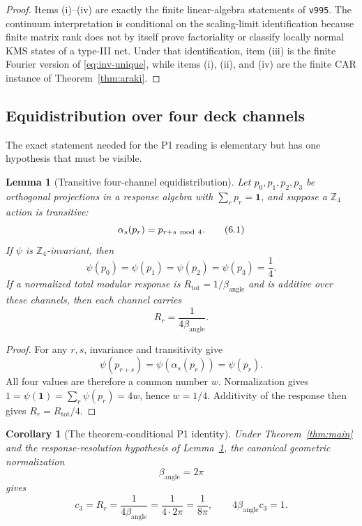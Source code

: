 \documentclass[11pt]{article}
\newtheorem{lemma}[theorem]{Lemma}
\newtheorem{corollary}[theorem]{Corollary}
\theoremstyle{remark}
\newcommand{\Z}{\mathbb Z}
\newcommand{\id}{\mathbf 1}
\begin{document}
\begin{proof}
Items (i)--(iv) are exactly the finite linear-algebra statements of
\texttt{v995}.  The continuum interpretation is conditional on the
scaling-limit identification because finite matrix rank does not by
itself prove factoriality or classify locally normal KMS states of a
type-III net.  Under that identification, item (iii) is the finite
Fourier version of \eqref{eq:inv-unique}, while items (i), (ii), and
(iv) are the finite CAR instance of Theorem~\ref{thm:araki}.
\end{proof}

\subsection{Equidistribution over four deck channels}

The exact statement needed for the P1 reading is elementary but has
one hypothesis that must be visible.

\begin{lemma}[Transitive four-channel equidistribution]
\label{lem:equidistribution}
Let $p_0,p_1,p_2,p_3$ be orthogonal projections in a response
algebra with $\sum_rp_r=\id$, and suppose a $\Z_4$ action is
transitive:
\[
 \alpha_s(p_r)=p_{r+s\ {\rm mod}\ 4}.
\tag{6.1}\label{eq:transitive}
\]
If $\psi$ is $\Z_4$-invariant, then
\[
 \psi(p_0)=\psi(p_1)=\psi(p_2)=\psi(p_3)=\frac14.
\tag{6.2}\label{eq:quarter}
\]
If a normalized total modular response is
$R_{\mathrm{tot}}=1/\beta_{\mathrm{angle}}$ and is additive over
these channels, then each channel carries
\[
 R_r=\frac1{4\beta_{\mathrm{angle}}}.
\tag{6.3}\label{eq:response-quarter}
\]
\end{lemma}

\begin{proof}
For any $r,s$, invariance and transitivity give
\[
 \psi(p_{r+s})=\psi(\alpha_s(p_r))=\psi(p_r).
\]
All four values are therefore a common number $w$.  Normalization
gives $1=\psi(\id)=\sum_r\psi(p_r)=4w$, hence $w=1/4$.
Additivity of the response then gives
$R_r=R_{\mathrm{tot}}/4$.
\end{proof}

\begin{corollary}[The theorem-conditional P1 identity]
\label{cor:p1}
Under Theorem~\ref{thm:main} and the response-resolution hypothesis
of Lemma~\ref{lem:equidistribution}, the canonical geometric
normalization
\[
 \beta_{\mathrm{angle}}=2\pi
\tag{6.4}\label{eq:beta-angle}
\]
gives
\[
 c_3=R_r
 =\frac1{4\beta_{\mathrm{angle}}}
 =\frac1{4\cdot2\pi}
 =\frac1{8\pi},
\qquad
 4\beta_{\mathrm{angle}}c_3=1.
\tag{6.5}\label{eq:p1}
\]
\end{corollary}
\end{document}
